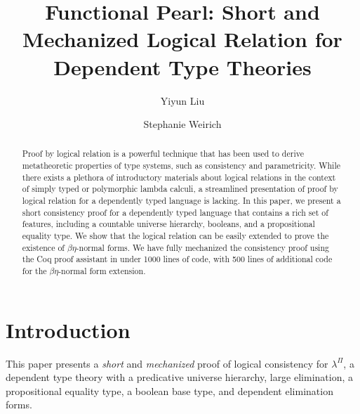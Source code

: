 \documentclass[\ifpublic nolinenum\else\fi,online,OA]{jfp}
\newcommand{\lang}{$\lambda^{\Pi}$\xspace}
\theoremstyle{definition}
\begin{document}
\totalpg{\pageref{lastpage}}

\title{Functional Pearl: Short and Mechanized Logical Relation for Dependent Type Theories}

\begin{authgrp}
\author{Yiyun Liu}


\author{Stephanie Weirich}
\end{authgrp}

\begin{abstract}
Proof by logical relation is a powerful technique that has been used
to derive metatheoretic properties of type systems, such as
consistency and parametricity. While there exists a
plethora of introductory materials about logical relations in the
context of simply typed or polymorphic lambda calculi, a streamlined
presentation of proof by logical relation for a dependently typed language
is lacking. In this paper, we present a short
consistency proof for a dependently typed language that contains a
rich set of features, including a countable universe
hierarchy, booleans, and a propositional equality type. We show that
the logical relation can be easily extended to prove the existence of
$\beta\eta$-normal forms.
We have
fully mechanized the consistency proof using the Coq proof assistant
in under 1000 lines of code, with 500 lines of additional code for the
$\beta\eta$-normal form extension.
\end{abstract}

\maketitle[T]

\section{Introduction}
This paper presents a \emph{short} and \emph{mechanized} proof of
logical consistency for \lang{}, a dependent type theory with a
predicative universe hierarchy, large elimination, a propositional equality
type, a boolean base type, and dependent elimination forms.
\end{document}
